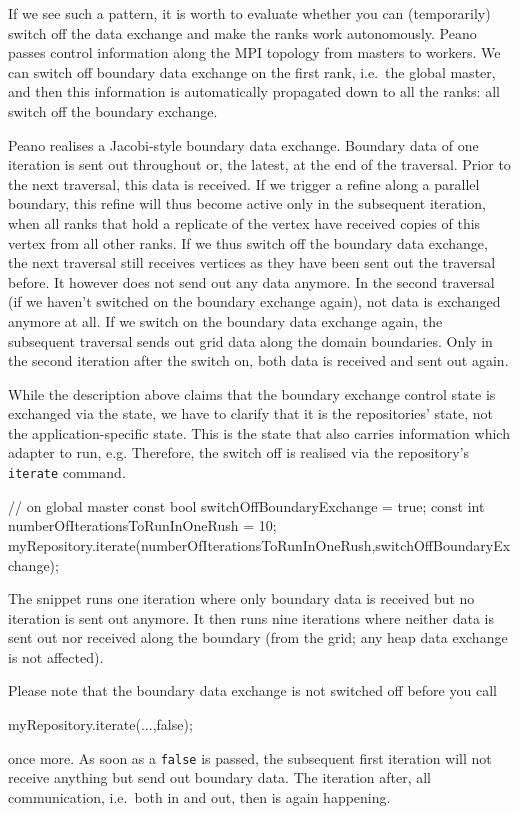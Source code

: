 If we see such a pattern, it is worth to evaluate whether you can (temporarily)
switch off the data exchange and make the ranks work autonomously.
Peano passes control information along the MPI topology from masters to workers. 
We can switch off boundary data exchange on the first rank, i.e.~the global
master, and then this information is automatically propagated down to all the
ranks: all switch off the boundary exchange.

Peano realises a Jacobi-style boundary data exchange. 
Boundary data of one iteration is sent out throughout or, the latest, at the end
of the traversal.
Prior to the next traversal, this data is received. 
If we trigger a refine along a parallel boundary, this refine will thus become
active only in the subsequent iteration, when all ranks that hold a replicate of
the vertex have received copies of this vertex from all other ranks.
If we thus switch off the boundary data exchange, the next traversal still
receives vertices as they have been sent out the traversal before.
It however does not send out any data anymore.
In the second traversal (if we haven't switched on the boundary exchange again),
not data is exchanged anymore at all.
If we switch on the boundary data exchange again, the subsequent traversal sends
out grid data along the domain boundaries. 
Only in the second iteration after the switch on, both data is received and sent
out again.

While the description above claims that the boundary exchange control state is
exchanged via the state, we have to clarify that it is the repositories' state,
not the application-specific state. This is the state that also carries
information which adapter to run, e.g.
Therefore, the switch off is realised via the repository's \texttt{iterate}
command. 

\begin{code}
// on global master
const bool switchOffBoundaryExchange = true;
const int  numberOfIterationsToRunInOneRush = 10;
myRepository.iterate(numberOfIterationsToRunInOneRush,switchOffBoundaryExchange);
\end{code}

\noindent
The snippet runs one iteration where only boundary data is received but no
iteration is sent out anymore.
It then runs nine iterations where neither data is sent out nor received along
the boundary (from the grid; any heap data exchange is not affected).

Please note that the boundary data exchange is not switched off before you call 
\begin{code}
myRepository.iterate(...,false);
\end{code}
\noindent
once more. As soon as a \texttt{false} is passed, the subsequent first iteration
will not receive anything but send out boundary data. 
The iteration after, all communication, i.e.~both in and out, then is again
happening.



